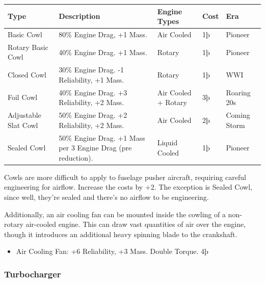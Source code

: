 \documentclass{article}
\begin{document}
\begin{tabular}{|l|l|l|l|l|}
    \hline
    Type                 & Description                                      & Engine Types & Cost    & Era     \\\hline
    Basic Cowl           & 80\% Engine Drag, +1 Mass.                       & Air Cooled   & 1þ      & Pioneer \\\hline
    Rotary Basic Cowl    & 40\% Engine Drag. +1 Mass.                       & Rotary       & 1þ      &
    Pioneer                                                                                                    \\\hline
    Closed Cowl          & 30\% Engine Drag. -1 Reliability, +1 Mass.       & Rotary       & 1þ      &
    WWI                                                                                                        \\\hline
    Foil Cowl            & 40\% Engine Drag. +3 Reliability, +2 Mass.       & Air Cooled +
    Rotary               & 3þ                                               & Roaring 20s                      \\\hline
    Adjustable Slat Cowl & 50\% Engine Drag. +2 Reliability, +2 Mass.       & Air
    Cooled               & 2þ                                               & Coming Storm                     \\\hline
    Sealed Cowl          & 50\% Engine Drag. +1 Mass per 3 Engine Drag (pre
    reduction).          & Liquid Cooled                                    & 1þ           & Pioneer           \\\hline
\end{tabular}

Cowls are more difficult to apply to fuselage pusher aircraft,
requiring careful engineering for airflow. Increase the costs by +2.
The exception is Sealed Cowl, since well, they're sealed and there's no airflow
to be engineering.

Additionally, an air cooling fan can be mounted inside the
cowling of a non-rotary air-cooled engine. This can draw vast quantities
of air over the engine, though it introduces an additional heavy
spinning blade to the crankshaft.

\begin{itemize}
    \item          Air Cooling Fan: +6 Reliability, +3 Mass. Double Torque. 4þ
\end{itemize}

\subsubsection{Turbocharger}
\label{_Turbocharger}
\end{document}
